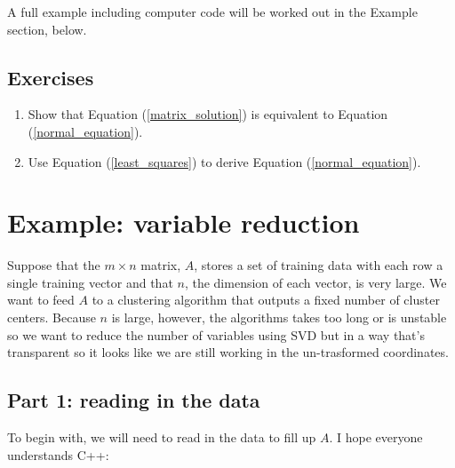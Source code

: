 \documentclass{article}
\begin{document}
A full example including computer code will be worked out in the Example
section, below.

\subsection{Exercises}

\begin{enumerate}
	\item Show that Equation (\ref{matrix_solution}) is equivalent to 
Equation (\ref{normal_equation}).

\item Use Equation (\ref{least_squares}) to derive Equation (\ref{normal_equation}).

\end{enumerate}

\section{Example: variable reduction}

Suppose that the $m \times n$ matrix, $A$, stores a set of training data with 
each row a single training vector 
and that $n$, the dimension of each vector, is very large.
We want to feed $A$ to a clustering algorithm that outputs a fixed number of
cluster centers.
Because $n$ is large, however, the algorithms takes too long or is
unstable so we want to reduce the number of variables using SVD but in a way
that's transparent so it looks like we are still working in the un-trasformed
coordinates.

\subsection{Part 1: reading in the data}

To begin with, we will need to read in the data to fill up $A$.
I hope everyone understands C++:
\end{document}
